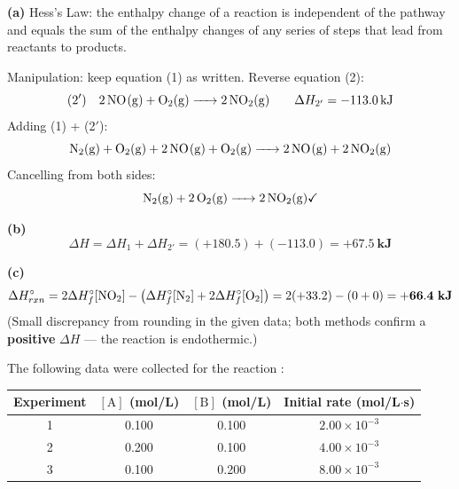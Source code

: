 \documentclass[addpoints]{exam}
\begin{document}
\begin{questions}
\begin{solution}[9cm]
\textbf{(a)} Hess's Law: the enthalpy change of a reaction is independent of the pathway and
equals the sum of the enthalpy changes of any series of steps that lead from reactants to products.

Manipulation: keep equation (1) as written. Reverse equation (2):
\[
\text{(2$'$)}\quad \ce{2NO(g) + O2(g) -> 2NO2(g)} \qquad \Delta H_{2'} = -\SI{113.0}{kJ}
\]
Adding (1) + (2$'$):
\[
\ce{N2(g) + O2(g) + 2NO(g) + O2(g) -> 2NO(g) + 2NO2(g)}
\]
Cancelling  from both sides:
\[
\ce{N2(g) + 2O2(g) -> 2NO2(g)} \checkmark
\]

\textbf{(b)}
\[
\Delta H = \Delta H_1 + \Delta H_{2'} = (+180.5) + (-113.0) = \mathbf{+67.5\ kJ}
\]

\textbf{(c)}
\[
\Delta H^\circ_{rxn} = 2\Delta H^\circ_f[\ce{NO2}] - \bigl(\Delta H^\circ_f[\ce{N2}]
+ 2\Delta H^\circ_f[\ce{O2}]\bigr) = 2(+33.2) - (0 + 0) = \mathbf{+66.4\ kJ}
\]
(Small discrepancy from rounding in the given data; both methods confirm a \textbf{positive}
$\Delta H$ --- the reaction is endothermic.)
\end{solution}

\question The following data were collected for the reaction :

\begin{center}
\begin{tabular}{cccc}
\hline
Experiment & $[\text{A}]$ (mol/L) & $[\text{B}]$ (mol/L) & Initial rate (mol/L$\cdot$s) \\
\hline
1 & 0.100 & 0.100 & $2.00 \times 10^{-3}$ \\
2 & 0.200 & 0.100 & $4.00 \times 10^{-3}$ \\
3 & 0.100 & 0.200 & $8.00 \times 10^{-3}$ \\
\hline
\end{tabular}
\end{center}

\end{questions}
\end{document}
